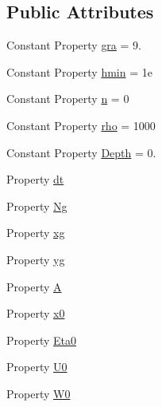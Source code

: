 \subsection*{Public Attributes}
\begin{DoxyCompactItemize}
\item 
Constant Property \hyperlink{class_solitary_wave_test_a237eb6815cd3aa02ad8b4c0300a47b52}{gra} = 9.
\item 
Constant Property \hyperlink{class_solitary_wave_test_ada8e9aa447b1476d2fbd90946d40c04d}{hmin} = 1e
\item 
Constant Property \hyperlink{class_solitary_wave_test_a9cb6a8b5003f9d3dea60d20f1fff8e5d}{n} = 0
\item 
Constant Property \hyperlink{class_solitary_wave_test_ab4c2a94e84d7c7651423868ab7f45cff}{rho} = 1000
\item 
Constant Property \hyperlink{class_solitary_wave_test_ad79179ce12f21d4c85f9dcae1d72b312}{Depth} = 0.
\item 
Property \hyperlink{class_solitary_wave_test_a563ac8d7045d36092b0e341092e59da7}{dt}
\item 
Property \hyperlink{class_solitary_wave_test_a50faa56cafb7f33a8f9b96d07bc000dd}{Ng}
\item 
Property \hyperlink{class_solitary_wave_test_ab1478eed5cfba472ce2a85bd524930d3}{xg}
\item 
Property \hyperlink{class_solitary_wave_test_aeb1997197dd20e04d564af1c4f184e1b}{yg}
\item 
Property \hyperlink{class_solitary_wave_test_aac44207b39c9f9c8c6098595f28195a4}{A}
\item 
Property \hyperlink{class_solitary_wave_test_a4adcecdb9e45a59c6353eb9c1d8ec893}{x0}
\item 
Property \hyperlink{class_solitary_wave_test_ae24c71d617d2d60c13c8d1fc1750139a}{Eta0}
\item 
Property \hyperlink{class_solitary_wave_test_a61d20dc729b4dabe71e8b2963a904fe6}{U0}
\item 
Property \hyperlink{class_solitary_wave_test_ad6848bfae39d7e83c094068bedd27c59}{W0}
\end{DoxyCompactItemize}
